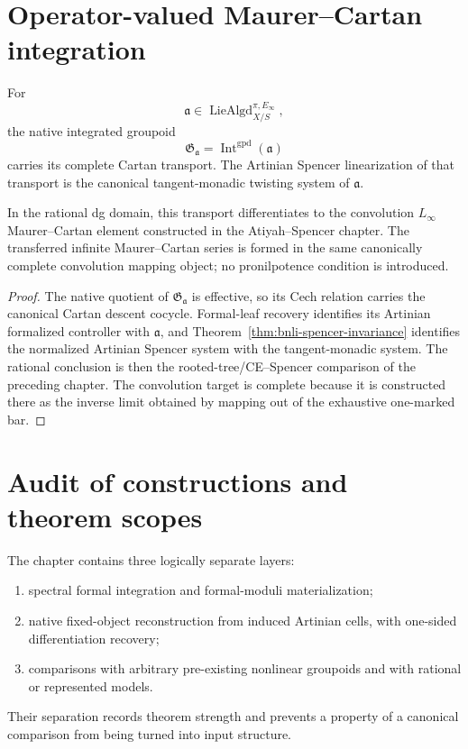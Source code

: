 \section{Operator-valued Maurer--Cartan integration}
\label{sec:bnli-operator-mc}

\begin{theorem}
\label{thm:bnli-operator-mc}
For
\[
    \mathfrak a
    \in
    \operatorname{LieAlgd}^{\pi,E_\infty}_{X/S},
\]
the native integrated groupoid
\[
    \mathfrak G_{\mathfrak a}
    =
    \operatorname{Int}^{\mathrm{gpd}}(\mathfrak a)
\]
carries its complete Cartan transport.  The Artinian Spencer linearization of
that transport is the canonical tangent-monadic twisting system of
\(\mathfrak a\).

In the rational dg domain, this transport differentiates to the convolution
\(L_\infty\) Maurer--Cartan element constructed in the Atiyah--Spencer chapter.
The transferred infinite Maurer--Cartan series is formed in the same
canonically complete convolution mapping object; no pronilpotence condition is
introduced.
\end{theorem}

\begin{proof}
The native quotient of \(\mathfrak G_{\mathfrak a}\) is effective, so its Cech
relation carries the canonical Cartan descent cocycle.  Formal-leaf recovery
identifies its Artinian formalized controller with \(\mathfrak a\), and
Theorem~\ref{thm:bnli-spencer-invariance} identifies the normalized Artinian
Spencer system with the tangent-monadic system.  The rational conclusion is
then the rooted-tree/CE--Spencer comparison of the preceding chapter.  The
convolution target is complete because it is constructed there as the inverse
limit obtained by mapping out of the exhaustive one-marked bar.
\end{proof}

\section{Audit of constructions and theorem scopes}
\label{sec:bnli-audit}

The chapter contains three logically separate layers:
\begin{enumerate}
    \item spectral formal integration and formal-moduli materialization;
    \item native fixed-object reconstruction from induced Artinian cells, with
    one-sided differentiation recovery;
    \item comparisons with arbitrary pre-existing nonlinear groupoids and with
    rational or represented models.
\end{enumerate}
Their separation records theorem strength and prevents a property of a
canonical comparison from being turned into input structure.

